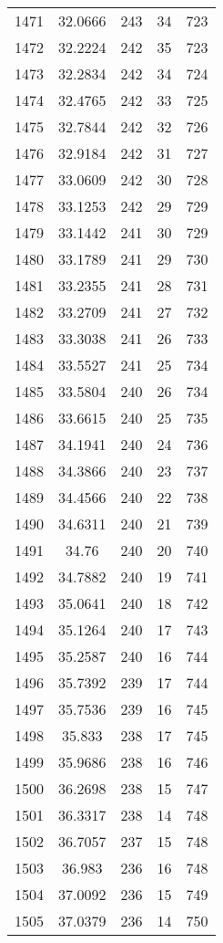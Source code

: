 \documentclass[12pt,a4paper]{article}
\begin{document}
\begin{tabular}{r|cccc}
	1471 & 32.0666 & 243 & 34 & 723 \\
	1472 & 32.2224 & 242 & 35 & 723 \\
	1473 & 32.2834 & 242 & 34 & 724 \\
	1474 & 32.4765 & 242 & 33 & 725 \\
	1475 & 32.7844 & 242 & 32 & 726 \\
	1476 & 32.9184 & 242 & 31 & 727 \\
	1477 & 33.0609 & 242 & 30 & 728 \\
	1478 & 33.1253 & 242 & 29 & 729 \\
	1479 & 33.1442 & 241 & 30 & 729 \\
	1480 & 33.1789 & 241 & 29 & 730 \\
	1481 & 33.2355 & 241 & 28 & 731 \\
	1482 & 33.2709 & 241 & 27 & 732 \\
	1483 & 33.3038 & 241 & 26 & 733 \\
	1484 & 33.5527 & 241 & 25 & 734 \\
	1485 & 33.5804 & 240 & 26 & 734 \\
	1486 & 33.6615 & 240 & 25 & 735 \\
	1487 & 34.1941 & 240 & 24 & 736 \\
	1488 & 34.3866 & 240 & 23 & 737 \\
	1489 & 34.4566 & 240 & 22 & 738 \\
	1490 & 34.6311 & 240 & 21 & 739 \\
	1491 & 34.76 & 240 & 20 & 740 \\
	1492 & 34.7882 & 240 & 19 & 741 \\
	1493 & 35.0641 & 240 & 18 & 742 \\
	1494 & 35.1264 & 240 & 17 & 743 \\
	1495 & 35.2587 & 240 & 16 & 744 \\
	1496 & 35.7392 & 239 & 17 & 744 \\
	1497 & 35.7536 & 239 & 16 & 745 \\
	1498 & 35.833 & 238 & 17 & 745 \\
	1499 & 35.9686 & 238 & 16 & 746 \\
	1500 & 36.2698 & 238 & 15 & 747 \\
	1501 & 36.3317 & 238 & 14 & 748 \\
	1502 & 36.7057 & 237 & 15 & 748 \\
	1503 & 36.983 & 236 & 16 & 748 \\
	1504 & 37.0092 & 236 & 15 & 749 \\
	1505 & 37.0379 & 236 & 14 & 750 \\

\end{tabular}
\end{document}
